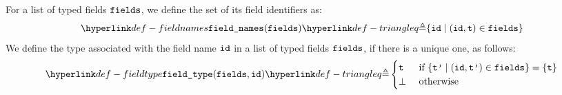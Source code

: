 \begin{mathpar}
\end{mathpar}

\hypertarget{def-fieldnames}{}
For a list of typed fields $\fields$, we define the set of its field identifiers as:
\[
  \fieldnames(\fields) \triangleq \{ \id \;|\; (\id, \vt) \in \fields\}
\]
\hypertarget{def-fieldtype}{}
We define the type associated with the field name $\id$ in a list of typed fields $\fields$,
if there is a unique one, as follows:
\[
  \fieldtype(\fields, \id) \triangleq
  \begin{cases}
  \vt  & \text{ if }\{ \vtp \;|\; (\id,\vtp) \in \fields\} = \{\vt\}\\
  \bot & \text{ otherwise}
  \end{cases}
\]

\begin{mathpar}
\end{mathpar}


